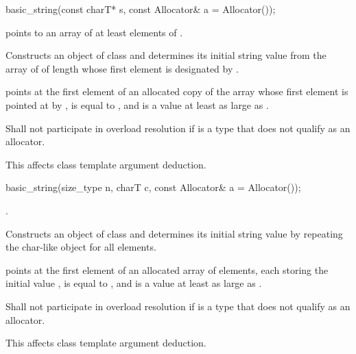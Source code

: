 %
\begin{itemdecl}
basic_string(const charT* s, const Allocator& a = Allocator());
\end{itemdecl}

\begin{itemdescr}
\pnum
\requires
{} points to an array of at least  elements
of .

\pnum
\effects
Constructs an object of class 
and determines its initial string value from the array of
 of length 
whose first element is designated by .

\pnum
\postconditions
{} points at the first element of an allocated copy
of the array whose first element is pointed at by ,
 is equal to , and
 is a value at least as large as .

\pnum
\remarks
Shall not participate in overload resolution
if  is a type
that does not qualify as an allocator.
\begin{note}
This affects class template argument deduction.
\end{note}
\end{itemdescr}

%
\begin{itemdecl}
basic_string(size_type n, charT c, const Allocator& a = Allocator());
\end{itemdecl}

\begin{itemdescr}
\pnum
\requires
{}.

\pnum
\effects
Constructs an object of class 
and determines its initial string value by repeating the char-like
object  for all  elements.

\pnum
\postconditions
{} points at the first element of an allocated array
of  elements, each storing the initial value ,
 is equal to , and
 is a value at least as large as .

\pnum
\remarks
Shall not participate in overload resolution
if  is a type
that does not qualify as an allocator.
\begin{note}
This affects class template argument deduction.
\end{note}
\end{itemdescr}

